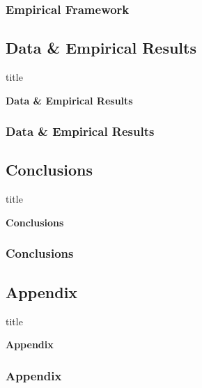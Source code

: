 \documentclass[11pt]{beamer}
\begin{document}
\begin{frame}

	\frametitle{\bfseries Empirical Framework}
\end{frame}
\begin{frame}
	\section[Data \& Results]{Data \& Empirical Results}
	
	\begin{beamercolorbox}{title}
		\begin{center}
			\bfseries \huge Data \& Empirical Results
		\end{center}	
	\end{beamercolorbox}
	
\end{frame}

\begin{frame}

	\frametitle{\bfseries Data \& Empirical Results}
\end{frame}

\begin{frame}
	\section[Conclusions]{Conclusions}
	
	\begin{beamercolorbox}{title}
		\begin{center}
			\bfseries \huge Conclusions
		\end{center}	
	\end{beamercolorbox}
	
\end{frame}

\begin{frame}

	\frametitle{\bfseries Conclusions}
\end{frame}



\begin{frame}
	\section[]{Appendix}
	
	\begin{beamercolorbox}{title}
		\begin{center}
			\bfseries \huge Appendix
		\end{center}	
	\end{beamercolorbox}
	
\end{frame}

\begin{frame}
	
	\frametitle{\bfseries Appendix}
\end{frame}



\end{document}
